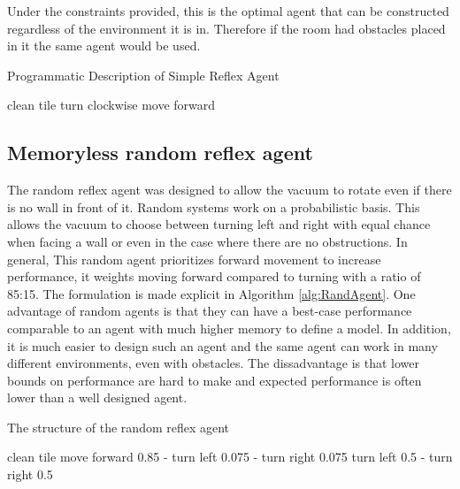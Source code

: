 \documentclass{article}
\begin{document}
Under the constraints provided, this is the optimal agent that can be constructed regardless of the environment it is in. Therefore if the room had obstacles placed in it the same agent would be used. 
\begin{algorithm}[h]
  
  \caption{Programmatic Description of Simple Reflex Agent}
  \begin{algorithmic}[1]
    
    \State clean tile 
    \EndIf
    \State turn clockwise
    \EndIf
    \State move forward
    \EndIf
    \EndFor
  \end{algorithmic}
  \label{alg:SimpleAgent}
\end{algorithm}
\subsection{Memoryless random reflex agent}
The random reflex agent was designed to allow the vacuum to rotate even if there is no wall in front of it. Random systems work on a probabilistic basis. This allows the vacuum to choose between turning left and right with equal chance when facing a wall or even in the case where there are no obstructions. In general, This random agent prioritizes forward movement to increase performance, it weights moving forward compared to turning with a ratio of 85:15.
The formulation is made explicit in Algorithm \ref{alg:RandAgent}. One advantage of random agents is that they can have a best-case performance comparable to an agent with much higher memory to define a model. In addition, it is much easier to design such an agent and the same agent can work in many different environments, even with obstacles. The dissadvantage is that lower bounds on performance are hard to make and expected performance is often lower than a well designed agent. 

\begin{algorithm}
  \caption{The structure of the random reflex agent}
  \begin{algorithmic}[1]
        \State clean tile
      \Else
           move forward 0.85 - turn left 0.075 - turn right 0.075
        \Else
          \State turn left 0.5 - turn right 0.5
        \EndIf
      \EndIf
    \EndFor
  \end{algorithmic}
  \label{alg:RandAgent}
\end{algorithm}
\end{document}
